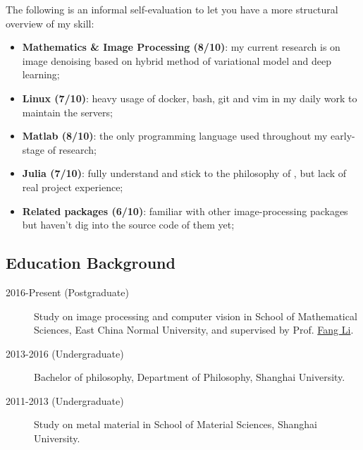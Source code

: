 The following is an informal self-evaluation to let you have a more structural overview of my skill:

\begin{itemize}
    \item \textbf{Mathematics \& Image Processing (8/10)}: my current research is on image denoising based on hybrid method of variational model and deep learning;
    \item \textbf{Linux (7/10)}: heavy usage of docker, bash, git and vim in my daily work to maintain the servers;
    \item \textbf{Matlab (8/10)}: the only programming language used throughout my early-stage of research;
    \item \textbf{Julia (7/10)}: fully understand and stick to the philosophy of \langjulia, but lack of real project experience;
    \item \textbf{Related packages (6/10)}: familiar with other image-processing packages but haven't dig into the source code of them yet;
\end{itemize}

\subsection*{Education Background}

\begin{description}
    \item[2016-Present (Postgraduate)]Study on image processing and computer vision in School of Mathematical Sciences, East China Normal University, and supervised by Prof. \href{http://math.ecnu.edu.cn/~fli/}{\textsf{Fang Li}}.
    \item[2013-2016 (Undergraduate)] Bachelor of philosophy, Department of Philosophy, Shanghai University.
    \item[2011-2013 (Undergraduate)] Study on metal material in School of Material Sciences, Shanghai University.
\end{description}
